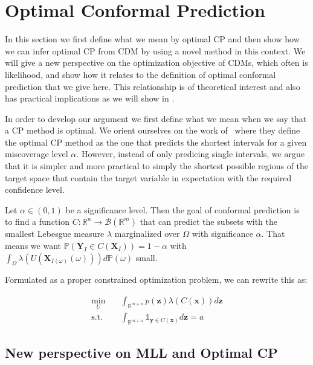 \section{Optimal Conformal Prediction}\label{sec:optimal_cp}

In this section we first define what we mean by optimal CP and then show how we can infer optimal CP from CDM by using a novel method in this context. We will give a new perspective on the optimization objective of CDMs, which often is likelihood, and show how it relates to the definition of optimal conformal prediction that we give here. This relationship is of theoretical interest and also has practical implications as we will show in . %

In order to develop our argument we first define what we mean when we say that a CP method is optimal. We orient ourselves on the work of~\cite{sesia2021conformal} where they define the optimal CP method as the one that predicts the shortest intervals for a given miscoverage level $\alpha$. However, instead of only predicing single intervals, we argue that it is simpler and more practical to simply the shortest possible regions of the target space that contain the target variable in expectation with the required confidence level.

Let $\alpha \in (0,1)$ be a significance level. Then the goal of conformal prediction is to find a function $C : \mathbb{R}^n \to \mathcal{B}(\mathbb{R}^m)$ that can predict the subsets with the smallest Lebesgue measure $\lambda$ marginalized over $\Omega$ with significance $\alpha$. That means we want $\mathbb{P}(\mathbf{Y}_I \in C(\mathbf{X}_I)) = 1 - \alpha$ with $\int_{\Omega}\lambda(U(\mathbf{X}_{I(\omega)}(\omega))) d\mathbb{P}(\omega)$ small.

Formulated as a proper constrained optimization problem, we can rewrite this as:

\begin{align}
    \min_U \quad      & \int_{\mathbb{R}^{m + n}} p(\mathbf{z})
    \lambda(C(\mathbf{x}))
    d\mathbf{z}
    \\
    \text{s.t.} \quad & \int_{\mathbb{R}^{m + n}} \mathds{1}_{\mathbf{y} \in
    C(\mathbf{x})} d\mathbf{z} = a
\end{align}

\subsection{New perspective on MLL and Optimal CP}\label{sec:optimal_cp_proofs}

